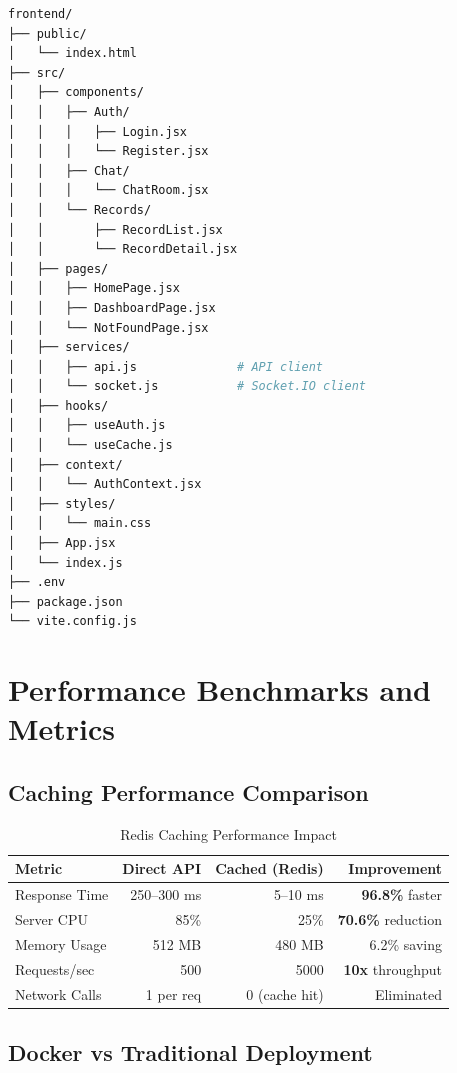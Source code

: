 \begin{lstlisting}[language=bash, caption=React Frontend Architecture]
frontend/
├── public/
│   └── index.html
├── src/
│   ├── components/
│   │   ├── Auth/
│   │   │   ├── Login.jsx
│   │   │   └── Register.jsx
│   │   ├── Chat/
│   │   │   └── ChatRoom.jsx
│   │   └── Records/
│   │       ├── RecordList.jsx
│   │       └── RecordDetail.jsx
│   ├── pages/
│   │   ├── HomePage.jsx
│   │   ├── DashboardPage.jsx
│   │   └── NotFoundPage.jsx
│   ├── services/
│   │   ├── api.js              # API client
│   │   └── socket.js           # Socket.IO client
│   ├── hooks/
│   │   ├── useAuth.js
│   │   └── useCache.js
│   ├── context/
│   │   └── AuthContext.jsx
│   ├── styles/
│   │   └── main.css
│   ├── App.jsx
│   └── index.js
├── .env
├── package.json
└── vite.config.js
\end{lstlisting}

\section{Performance Benchmarks and Metrics}

\subsection{Caching Performance Comparison}

\begin{table}[h]
    \centering
    \begin{tabular}{|l|r|r|r|}
        \hline
        \textbf{Metric} & \textbf{Direct API} & \textbf{Cached (Redis)} & \textbf{Improvement} \\
        \hline
        Response Time & 250--300 ms & 5--10 ms & \textbf{96.8\%} faster \\
        \hline
        Server CPU & 85\% & 25\% & \textbf{70.6\%} reduction \\
        \hline
        Memory Usage & 512 MB & 480 MB & 6.2\% saving \\
        \hline
        Requests/sec & 500 & 5000 & \textbf{10x} throughput \\
        \hline
        Network Calls & 1 per req & 0 (cache hit) & Eliminated \\
        \hline
    \end{tabular}
    \caption{Redis Caching Performance Impact}
\end{table}

\subsection{Docker vs Traditional Deployment}

